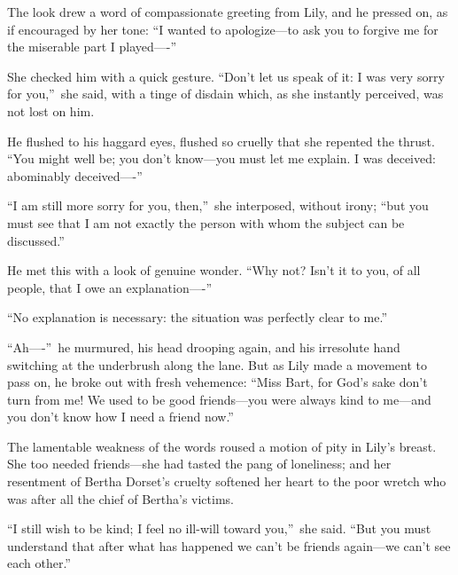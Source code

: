 \documentclass[12pt,a4paper]{book}
\begin{document}
The look drew a word of compassionate greeting from Lily, and he
pressed on, as if encouraged by her tone: ``I wanted to
apologize---to ask you to forgive me for the miserable part I
played----''





She checked him with a quick gesture. ``Don't let us speak of it: 
I was very sorry for you,''\ she said, with a tinge of disdain
which, as she instantly perceived, was not lost on him.





He flushed to his haggard eyes, flushed so cruelly that she
repented the thrust. ``You might well be; you don't know---you must
let me explain. I was deceived: abominably deceived----''





``I am still more sorry for you, then,''\ she interposed, without
irony; ``but you must see that I am not exactly the person with
whom the subject can be discussed.''





He met this with a look of genuine wonder. ``Why not? Isn't it to
you, of all people, that I owe an explanation----''





``No explanation is necessary: the situation was perfectly clear
to me.''





``Ah----''\ he murmured, his head drooping again, and his irresolute
hand switching at the underbrush along the lane. But as Lily made
a movement to pass on, he broke out with fresh vehemence: ``Miss
Bart, for God's sake don't turn from me! We used to be good
friends---you were always kind to me---and you don't know how I
need a friend now.''





The lamentable weakness of the words roused a motion of pity in
Lily's breast. She too needed friends---she had tasted the pang of
loneliness; and her resentment of Bertha Dorset's cruelty
softened her heart to the poor wretch who was after all the chief
of Bertha's victims.





``I still wish to be kind; I feel no ill-will toward you,''\ she
said. ``But you must understand that after what has happened we
can't be friends again---we can't see each other.''
\end{document}
